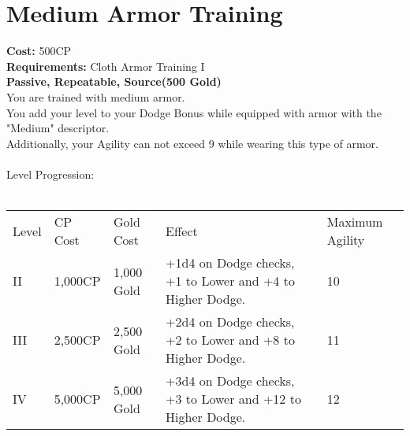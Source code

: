 \section{Medium Armor Training}\label{perk:mediumArmorTraining}
\textbf{Cost:} 500CP\\
\textbf{Requirements:} Cloth Armor Training I\\
\textbf{Passive, Repeatable, Source(500 Gold)}\\
You are trained with medium armor.\\
You add your level to your Dodge Bonus while equipped with armor with the "Medium" descriptor.\\
Additionally, your Agility can not exceed 9 while wearing this type of armor.\\
\\
Level Progression:\\
\\
\begin{tabular}{l | l | l | l | l}
	Level & CP Cost & Gold Cost & Effect & Maximum Agility
	\\
	II
	& 1,000CP
	& 1,000 Gold
	& +1d4 on Dodge checks, +1 to Lower and +4 to Higher Dodge.
	& 10
	\\
	III
	& 2,500CP
	& 2,500 Gold
	& +2d4 on Dodge checks, +2 to Lower and +8 to Higher Dodge.
	& 11
	\\
	IV
	& 5,000CP
	& 5,000 Gold
	& +3d4 on Dodge checks, +3 to Lower and +12 to Higher Dodge.
	& 12
	\\
\end{tabular}